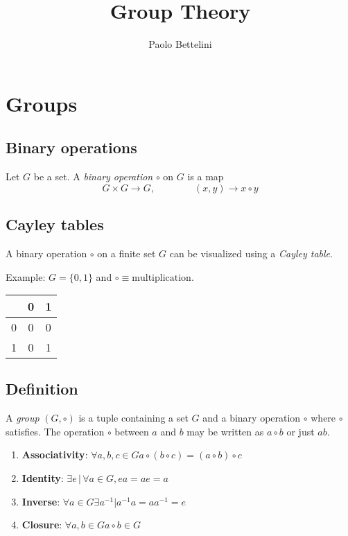 \documentclass[a4paper]{article}
\title{Group Theory}
\author{Paolo Bettelini}
\date{}
\begin{document}
\maketitle
\tableofcontents
\pagebreak

\section{Groups}

\subsection{Binary operations}

Let \(G\) be a set. A \textit{binary operation} \(\circ\) on \(G\) is a map
\[
    G \times G \to G,
    \quad\quad\quad\quad
    (x,y) \to x \circ y
\]


\subsection{Cayley tables}

A binary operation \(\circ\) on a finite set \(G\) can be
visualized using a \textit{Cayley table}.

Example: \(G=\{0,1\}\) and \(\circ \equiv \text{multiplication}\).
\begin{tabular}{|c|c|c|}
    \hline
    \circ{} & 0 & 1 \\
    \hline
    0 & 0 & 0 \\
    \hline
    1 & 0 & 1 \\
    \hline
\end{tabular}

\subsection{Definition}

A \textit{group} \((G,\circ)\) is a tuple containing a set \(G\) and
a binary operation \(\circ\) where \(\circ\) satisfies.
The operation \(\circ\) between \(a\) and \(b\) may be written as
\(a\circ b\) or just \(ab\).

\begin{enumerate}
    \item \textbf{Associativity}: \(\forall a,b,c\in G a \circ (b \circ c) = (a \circ b) \circ c\)
    \item \textbf{Identity}: \(\exists e \,|\, \forall a \in G, ea=ae=a\) 
    \item \textbf{Inverse}: \(\forall a\in G \exists a^{-1} | a^{-1}a = aa^{-1} = e\)
    \item \textbf{Closure}: \(\forall a,b\in G a \circ b \in G\)
\end{enumerate}
\end{document}
